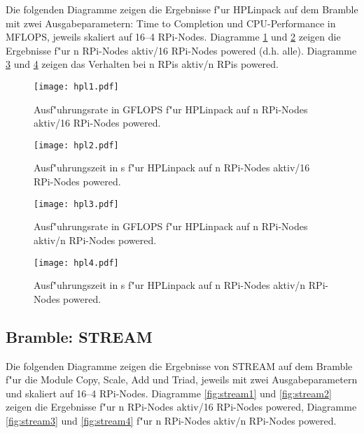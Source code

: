 Die folgenden Diagramme zeigen die Ergebnisse f"ur HPLinpack auf dem Bramble mit zwei Ausgabeparametern: Time to Completion und CPU-Performance in MFLOPS, jeweils skaliert auf 16--4 RPi-Nodes. Diagramme \ref{fig:hpl1} und \ref{fig:hpl2} zeigen die Ergebnisse f"ur n RPi-Nodes aktiv/16 RPi-Nodes powered (d.h. alle). Diagramme \ref{fig:hpl3} und \ref{fig:hpl4} zeigen das Verhalten bei n RPis aktiv/n RPis powered.
\enlargethispage*{2cm}
\begin{figure}[htb]
  \centering
  \texttt{[image: hpl1.pdf]}\\ 
  \caption{Ausf"uhrungsrate in GFLOPS f"ur HPLinpack auf n RPi-Nodes aktiv/16 RPi-Nodes powered.}
  \label{fig:hpl1}		
\end{figure}
\begin{figure}[h!]
  \centering
  \texttt{[image: hpl2.pdf]}\\ 
  \caption{Ausf"uhrungszeit in s f"ur HPLinpack auf n RPi-Nodes aktiv/16 RPi-Nodes powered.}
  \label{fig:hpl2}		
\end{figure}
\begin{figure}[htb]
  \centering
  \texttt{[image: hpl3.pdf]}\\ 
  \caption{Ausf"uhrungsrate in GFLOPS f"ur HPLinpack auf n RPi-Nodes aktiv/n RPi-Nodes powered.}
  \label{fig:hpl3}		
\end{figure}
\begin{figure}[h!]
  \centering
  \texttt{[image: hpl4.pdf]}\\ 
  \caption{Ausf"uhrungszeit in s f"ur HPLinpack auf n RPi-Nodes aktiv/n RPi-Nodes powered.}
  \label{fig:hpl4}		
\end{figure}

\newpage
\subsection{Bramble: STREAM}\label{Ergebnisse-Stream}
Die folgenden Diagramme zeigen die Ergebnisse von STREAM auf dem Bramble f"ur die Module Copy, Scale, Add und Triad, jeweils mit zwei Ausgabeparametern und skaliert auf 16--4 RPi-Nodes. Diagramme \ref{fig:stream1} und \ref{fig:stream2} zeigen die Ergebnisse f"ur n RPi-Nodes aktiv/16 RPi-Nodes powered, Diagramme \ref{fig:stream3} und \ref{fig:stream4} f"ur n RPi-Nodes aktiv/n RPi-Nodes powered. 

